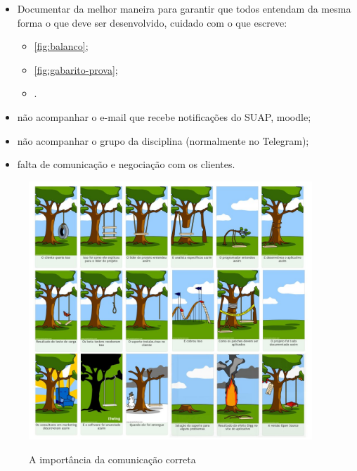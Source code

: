 \begin{itemize}
    \item Documentar da melhor maneira para garantir que todos entendam da mesma forma o que deve ser desenvolvido, cuidado com o que escreve:
    \begin{itemize}
        \item \autoref{fig:balanco};
        
        \item \autoref{fig:gabarito-prova};
        
        \item {}.
    \end{itemize}

    \item não acompanhar o e-mail que recebe notificações do SUAP, moodle;
    
    \item não acompanhar o grupo da disciplina (normalmente no Telegram);
    
    \item falta de comunicação e negociação com os clientes.
\end{itemize}


\begin{figure}
    \centering
    \caption{A importância da comunicação correta}
	\includegraphics[width=0.95\textwidth]{erros/projeto_balanca_na_arvore.jpg}
    \label{fig:balanco}
\end{figure}


